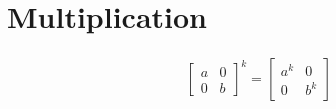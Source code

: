 \section{Multiplication}

\begin{align*}
  \begin{bmatrix}
    a & 0 \\ 
    0 & b
  \end{bmatrix}^{k} = 
  \begin{bmatrix}
    a^{k} & 0 \\ 
    0 & b^{k}
  \end{bmatrix}
\end{align*}
